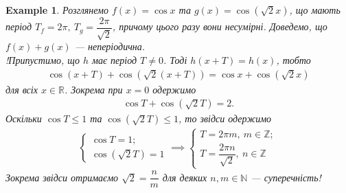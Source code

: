 \documentclass[a4paper, 10pt]{article}
\theoremstyle{theoremdd}
\theoremstyle{theoremdd}
\theoremstyle{theoremdd}
\theoremstyle{theoremdd}
\newtheorem{example}[theorem]{Example}
\theoremstyle{theoremdd}
\theoremstyle{theoremdd}
\theoremstyle{theoremdd}
\theoremstyle{theoremdd}
\begin{document}
\begin{example}
Розглянемо $f(x) = \cos x$ та $g(x) = \cos (\sqrt{2}x)$, що мають період $T_f = 2\pi,\ T_g = \dfrac{2\pi}{\sqrt{2}}$, причому цього разу вони несумірні. Доведемо, що $f(x) + g(x)$ --- неперіодична.
\bigskip \\
!Припустимо, що $h$ має період $T \neq 0$. Тоді $h(x+T) = h(x)$, тобто
\begin{align*}
\cos (x+T) + \cos(\sqrt{2}(x+T)) = \cos x + \cos(\sqrt{2}x)
\end{align*}
для всіх $x \in \mathbb{R}$. Зокрема при $x = 0$ одержимо
\begin{align*}
\cos T + \cos (\sqrt{2} T) = 2.
\end{align*} 
Оскільки $\cos T \leq 1$ та $\cos (\sqrt{2}T) \leq 1$, то звідси одержимо
\begin{align*}
\begin{cases}
\cos T = 1; \\
\cos (\sqrt{2}T) = 1
\end{cases} \implies  \begin{cases} T = 2\pi m,\ m \in \mathbb{Z}; \\ T = \dfrac{2\pi n}{\sqrt{2}},\ n \in \mathbb{Z} \end{cases}
\end{align*}
Зокрема звідси отримаємо $\sqrt{2} = \dfrac{n}{m}$ для деяких $n,m \in \mathbb{N}$ --- суперечність!
\end{example}
\end{document}
